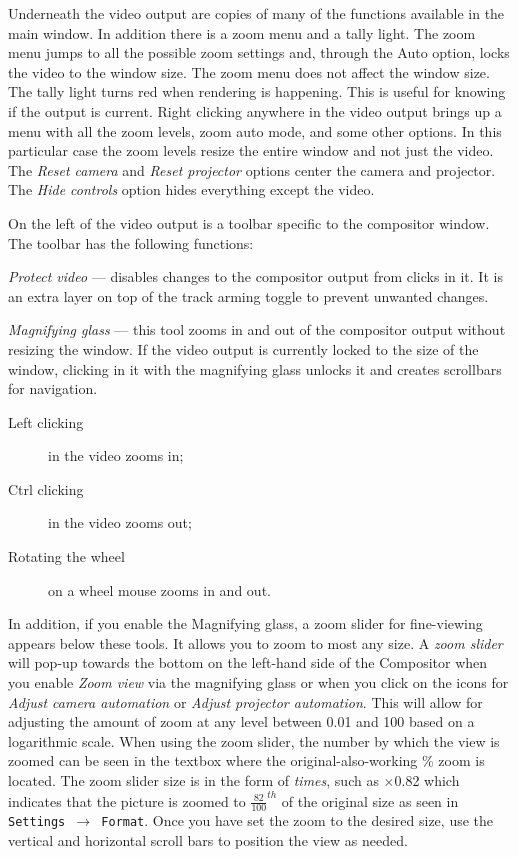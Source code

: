 Underneath the video output are copies of many of the functions available in the main window. 
In addition there is a zoom menu and a tally light. 
The zoom menu jumps to all the possible zoom settings and, through the Auto option, locks the video to the window size. 
The zoom menu does not affect the window size. 
The tally light turns red when rendering is happening. This is useful for knowing if the output is current. 
Right clicking anywhere in the video output brings up a menu with all the zoom levels, zoom auto mode, and some other options. 
In this particular case the zoom levels resize the entire window and not just the video. 
The \emph{Reset camera} and \emph{Reset projector} options center the camera and projector. 
The \emph{Hide controls} option hides everything except the video. 

On the left of the video output is a toolbar specific to the compositor window. The toolbar has the following functions:

\emph{Protect video} --- disables changes to the compositor output from clicks in it. It is an extra layer on top of the track arming toggle to prevent unwanted changes.

\emph{Magnifying glass} --- this tool zooms in and out of the compositor output without resizing the window. If the video output is currently locked to the size of the window, clicking in it with the magnifying glass unlocks it and creates scrollbars for navigation.

\begin{description}
    \item[Left clicking] in the video zooms in;
    \item[Ctrl clicking] in the video zooms out;
    \item[Rotating the wheel] on a wheel mouse zooms in and out.
\end{description}

In addition, if you enable the Magnifying glass, a zoom slider for fine-viewing appears below these tools.  
It allows you to zoom to most any size. 
A \textit{zoom slider} will pop-up towards the bottom on the left-hand side of the Compositor when you enable \textit{Zoom view} via the magnifying glass or when you click on the icons for \textit{Adjust camera automation} or \textit{Adjust projector automation}.  
This will allow for adjusting the amount of zoom at any level between 0.01 and 100 based on a logarithmic scale.  
When using the zoom slider, the number by which the view is zoomed can be seen in the textbox where the original-also-working \% zoom is located.  
The zoom slider size is in the form of \textit{times}, such as $\times$0.82 which indicates that the picture is zoomed to $\frac{82}{100}^{th}$ of the original size as seen in \texttt{Settings $\rightarrow$ Format}.  
Once you have set the zoom to the desired size, use the vertical and horizontal scroll bars to position the view as needed.

